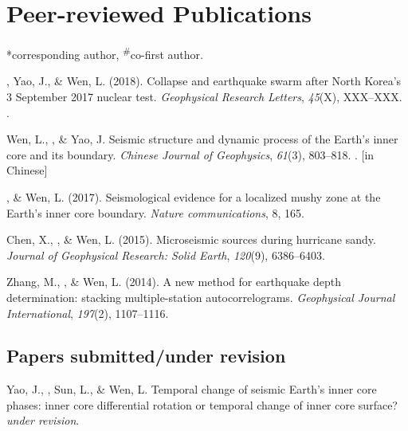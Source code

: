 \section*{Peer-reviewed Publications}
*corresponding author, \textsuperscript{\#}co-first author.

\begin{etaremune}
\item
    \Tian*, Yao, J., \& Wen, L. (2018).
    Collapse and earthquake swarm after North Korea's 3 September 2017 nuclear test.
    \textit{Geophysical Research Letters}, \textit{45}(X), XXX--XXX.
    .
\item
    Wen, L., \Tian, \& Yao, J.
    Seismic structure and dynamic process of the Earth's inner core and its boundary.
    \textit{Chinese Journal of Geophysics}, \textit{61}(3), 803--818.
    . [in Chinese]
\item
    \Tian, \& Wen, L. (2017).
    Seismological evidence for a localized mushy zone at the Earth's inner core boundary.
    \textit{Nature communications}, 8, 165.
\item
    Chen, X., \Tian, \& Wen, L. (2015).
    Microseismic sources during hurricane sandy.
    \textit{Journal of Geophysical Research: Solid Earth}, \textit{120}(9), 6386--6403.
\item Zhang, M., \Tian, \& Wen, L. (2014).
    A new method for earthquake depth determination: stacking multiple-station autocorrelograms.
    \textit{Geophysical Journal International}, \textit{197}(2), 1107--1116.\\
\end{etaremune}

\subsection*{Papers submitted/under revision}
\begin{etaremune}
\item
    Yao, J., \Tian, Sun, L., \& Wen, L.
    Temporal change of seismic Earth's inner core phases: inner core differential rotation or temporal change of inner core surface?
    \textit{under revision}.
\end{etaremune}

